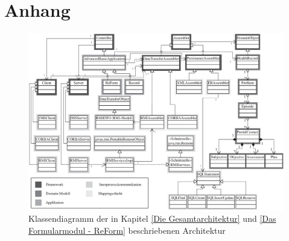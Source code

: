 
\chapter*{Anhang}

\setcounter{chapter}{7}

\setcounter{figure}{0}



\cleardoublepage

\begin{figure}[h]
    \begin{center}
       \includegraphics[bb=0 0 800 550,angle= 90,scale=0.78]{Bilder/GesamtModell_schattiert.eps}
       \caption{Klassendiagramm der in Kapitel \ref{Die Gesamtarchitektur} und \ref{Das Formularmodul - ReForm} beschriebenen Architektur}
       \label{fig:Vollstaendiges Klassendiagramm}
    \end{center}
\end{figure}

\cleardoublepage




